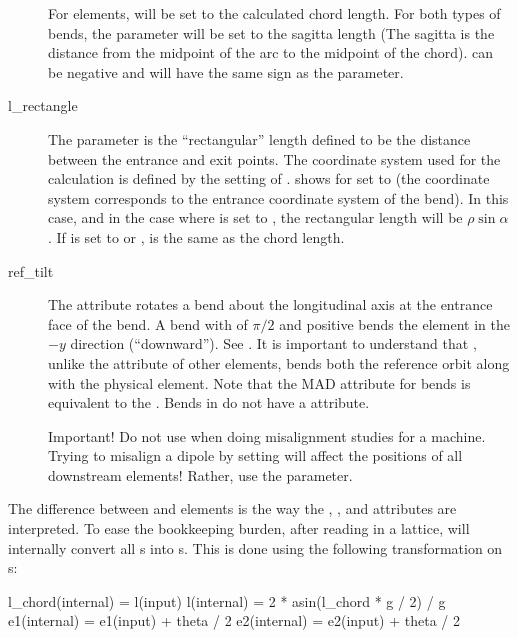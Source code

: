 \begin{description}
For  elements,  will be set to the calculated chord length. For both types of
bends, the  parameter will be set to the sagitta length (The sagitta is the distance
from the midpoint of the arc to the midpoint of the chord).  can be negative and will have
the same sign as the  parameter.
  \item[l_rectangle] \Newline
The  parameter is the ``rectangular'' length defined to be the distance between the
entrance and exit points. The coordinate system used for the calculation is defined by the setting
of .  shows  for  set to
 (the coordinate system corresponds to the entrance coordinate system of the bend).
In this case, and in the case where  is set to , the rectangular
length will be $\rho \sin\alpha$. If  is set to  or ,
 is the same as the chord length.
  \item[ref_tilt] \Newline
The  attribute rotates a bend about the longitudinal axis at the entrance face of the
bend. A bend with  of $\pi/2$ and positive  bends the element in the $-y$
direction (``downward''). See . It is important to understand that ,
unlike the  attribute of other elements, bends both the reference orbit along with the
physical element. Note that the MAD  attribute for bends is equivalent to the \bmad
{}. Bends in \bmad do not have a  attribute.

Important! Do not use  when doing misalignment studies for a machine. Trying to misalign
a dipole by setting  will affect the positions of all downstream elements! Rather, use the
 parameter.
  \end{description}


The difference between  and  elements is the way the , , and
 attributes are interpreted.  To ease the bookkeeping burden, after reading in a lattice,
\bmad will internally convert all s into s.  This is done using the following
transformation on s:
\begin{example}
  l_chord(internal) = l(input)
  l(internal) = 2 * asin(l_chord * g / 2) / g
  e1(internal) = e1(input) + theta / 2
  e2(internal) = e2(input) + theta / 2
\end{example}

